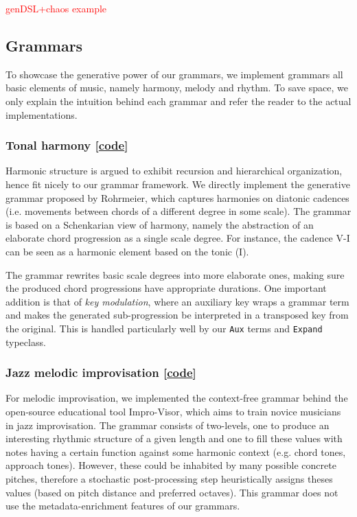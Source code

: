 \documentclass[11pt,a4paper]{article}
\newcommand{\icode}[1]{\texttt{#1}}
\newcommand\todo[1]{\textcolor{red}{#1}}
\begin{document}
\todo{genDSL+chaos example}

\subsection{Grammars}
To showcase the generative power of our grammars, we implement grammars all basic elements of music, namely harmony, melody and rhythm. To save space, we only explain the intuition behind each grammar and refer the reader to the actual implementations.

\subsubsection{Tonal harmony [\href{https://github.com/omelkonian/AlgoRhythm/blob/master/AlgoRhythm/src/Grammar/TonalHarmony.hs}{code}]}
Harmonic structure is argued to exhibit recursion and hierarchical organization, hence fit nicely to our grammar framework. We directly implement the generative grammar proposed by Rohrmeier\cite{tonal}, which captures harmonies on diatonic cadences (i.e. movements between chords of a different degree in some scale). The grammar is based on a Schenkarian view of harmony\cite{schenker}, namely the abstraction of an elaborate chord progression as a single scale degree. For instance, the cadence V-I can be seen as a harmonic element based on the tonic (I).

The grammar rewrites basic scale degrees into more elaborate ones, making sure the produced chord progressions have appropriate durations. One important addition is that of \textit{key modulation}, where an auxiliary key wraps a grammar term and makes the generated sub-progression be interpreted in a transposed key from the original. This is handled particularly well by our \icode{Aux} terms and \icode{Expand} typeclass.

\subsubsection{Jazz melodic improvisation [\href{https://github.com/omelkonian/AlgoRhythm/blob/master/AlgoRhythm/src/Grammar/Melody.hs}{code}]}
For melodic improvisation, we implemented the context-free grammar behind the open-source educational tool Impro-Visor\cite{improvisor}, which aims to train novice musicians in jazz improvisation. The grammar consists of two-levels, one to produce an interesting rhythmic structure of a given length and one to fill these values with notes having a certain function against some harmonic context (e.g. chord tones, approach tones). However, these could be inhabited by many possible concrete pitches, therefore a stochastic post-processing step heuristically assigns theses values (based on pitch distance and preferred octaves). This grammar does not use the metadata-enrichment features of our grammars.
\end{document}
